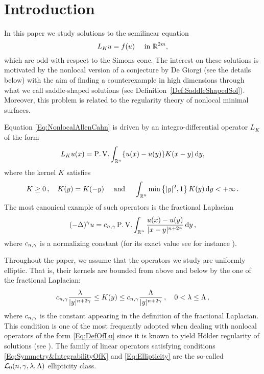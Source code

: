 \section{Introduction}
\label{Sec:Introduction}


In this paper we study solutions to the semilinear equation
\begin{equation}
\label{Eq:NonlocalAllenCahn}
L_K u = f(u) \quad \textrm{ in } \mathbb{R}^{2m},
\end{equation}
which are odd with respect to the Simons cone. The interest on these solutions is motivated by the nonlocal version of a conjecture by De Giorgi (see the details below) with the aim of finding a counterexample in high dimensions through what we call saddle-shaped solutions (see Definition~\ref{Def:SaddleShapedSol}). Moreover, this problem is related to the regularity theory of nonlocal minimal surfaces.

Equation \eqref{Eq:NonlocalAllenCahn} is driven by an integro-differential operator $L_K$ of the form
\begin{equation}
\label{Eq:DefOfLu}
L_Ku(x) = \operatorname{P.V.} \int_{\mathbb{R}^n} \{u(x) - u(y)\} K(x-y)\,\mathrm{d} y,
\end{equation}
where the kernel $K$ satisfies
\begin{equation}
\label{Eq:Symmetry&IntegrabilityOfK}
K\geq 0\,, \quad K(y) = K(-y) \quad \textrm{ and } \quad \int_{\mathbb{R}^n} \min \left\{ |y|^2, 1 \right\} K(y) \,\mathrm{d} y < + \infty\,.
\end{equation}
The most canonical example of such operators is the fractional Laplacian
$$
(-\Delta)^\gamma u = c_{n, \gamma} \operatorname{P.V.} \int_{\mathbb{R}^n} \dfrac{u(x) - u(y)}{|x-y|^{n + 2\gamma}}\,\mathrm{d} y\,,
$$
where $c_{n, \gamma}$ is a normalizing constant (for its exact value see for instance \cite{HitchhikerGuide}).

Throughout the paper, we assume that the operators we study are uniformly elliptic. That is, their kernels are bounded from above and below by the one of the fractional Laplacian:
\begin{equation}
\label{Eq:Ellipticity}
c_{n,\gamma}\dfrac{\lambda}{|y|^{n+2\gamma}} \leq K(y) \leq c_{n,\gamma}\dfrac{\Lambda}{|y|^{n+2\gamma}}\,, \quad 0< \lambda \leq \Lambda \,,
\end{equation}
where $c_{n,\gamma}$ is the constant appearing in the definition of the fractional Laplacian. This condition is one of the most frequently adopted when dealing with nonlocal operators of the form \eqref{Eq:DefOfLu} since it is known to yield Hölder regularity of solutions (see \cite{RosOton-Survey,SerraC2s+alphaRegularity}). The family of linear operators satisfying conditions \eqref{Eq:Symmetry&IntegrabilityOfK} and \eqref{Eq:Ellipticity} are the so-called $\mathcal{L}_0(n,\gamma,\lambda, \Lambda)$ ellipticity class.

